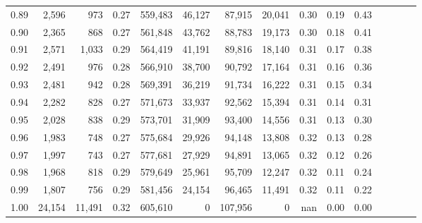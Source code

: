 \begin{tabular}{rrrcrrrrrrrrrrr}
0.89 &   2,596 &     973 &                                       0.27 &  559,483 &   46,127 &   87,915 &   20,041 &  0.30 &  0.19 &                         0.43 \\
0.90 &   2,365 &     868 &                                       0.27 &  561,848 &   43,762 &   88,783 &   19,173 &  0.30 &  0.18 &                         0.41 \\
0.91 &   2,571 &   1,033 &                                       0.29 &  564,419 &   41,191 &   89,816 &   18,140 &  0.31 &  0.17 &                         0.38 \\
0.92 &   2,491 &     976 &                                       0.28 &  566,910 &   38,700 &   90,792 &   17,164 &  0.31 &  0.16 &                         0.36 \\
0.93 &   2,481 &     942 &                                       0.28 &  569,391 &   36,219 &   91,734 &   16,222 &  0.31 &  0.15 &                         0.34 \\
0.94 &   2,282 &     828 &                                       0.27 &  571,673 &   33,937 &   92,562 &   15,394 &  0.31 &  0.14 &                         0.31 \\
0.95 &   2,028 &     838 &                                       0.29 &  573,701 &   31,909 &   93,400 &   14,556 &  0.31 &  0.13 &                         0.30 \\
0.96 &   1,983 &     748 &                                       0.27 &  575,684 &   29,926 &   94,148 &   13,808 &  0.32 &  0.13 &                         0.28 \\
0.97 &   1,997 &     743 &                                       0.27 &  577,681 &   27,929 &   94,891 &   13,065 &  0.32 &  0.12 &                         0.26 \\
0.98 &   1,968 &     818 &                                       0.29 &  579,649 &   25,961 &   95,709 &   12,247 &  0.32 &  0.11 &                         0.24 \\
0.99 &   1,807 &     756 &                                       0.29 &  581,456 &   24,154 &   96,465 &   11,491 &  0.32 &  0.11 &                         0.22 \\
1.00 &  24,154 &  11,491 &                                       0.32 &  605,610 &        0 &  107,956 &        0 &   nan &  0.00 &                         0.00 \\
\bottomrule
\end{tabular}

